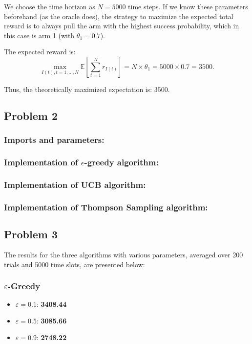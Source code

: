 \documentclass[11pt]{article}
\begin{document}
We choose the time horizon as \( N = 5000 \) time steps. If we know these parameters beforehand (as the oracle does), the strategy to maximize the expected total reward is to always pull the arm with the highest success probability, which in this case is arm 1 (with \(\theta_1 = 0.7\)).

The expected reward is:
\[
\max_{I(t), t = 1, \dots, N} \mathbb{E} \left[ \sum_{t=1}^{N} r_{I(t)} \right] = N \times \theta_1 = 5000 \times 0.7 = 3500.
\]

Thus, the theoretically maximized expectation is: $\boxed{3500.}$

\newpage
\subsection{Problem 2}

\subsubsection*{Imports and parameters:}


\subsubsection*{Implementation of $\epsilon$-greedy algorithm:}


\subsubsection*{Implementation of UCB algorithm:}


\subsubsection*{Implementation of Thompson Sampling algorithm:}


\newpage
\subsection{Problem 3}
The results for the three algorithms with various parameters, averaged over 200 trials and 5000 time slots, are presented below:

\subsubsection*{\(\varepsilon\)-Greedy}
\begin{itemize}
    \item \(\varepsilon = 0.1\): \textbf{3408.44}
    \item \(\varepsilon = 0.5\): \textbf{3085.66}
    \item \(\varepsilon = 0.9\): \textbf{2748.22}
\end{itemize}
\end{document}
